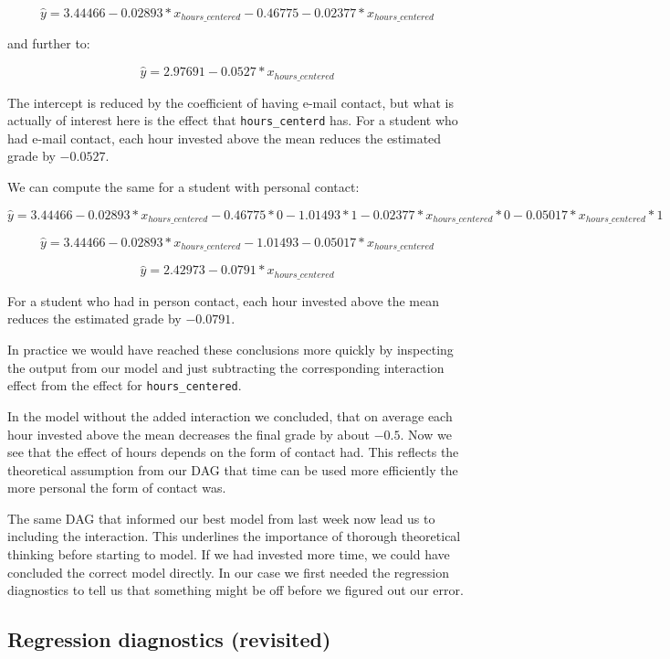 \documentclass[
]{book}
\begin{document}
\[\hat{y} = 3.44466 -0.02893 *x_{hours\_centered} -0.46775 -0.02377 * x_{hours\_centered}\]

and further to:

\[\hat{y} = 2.97691 -0.0527 *x_{hours\_centered}\]

The intercept is reduced by the coefficient of having e-mail contact, but what
is actually of interest here is the effect that \texttt{hours\_centerd} has. For a
student who had e-mail contact, each hour invested above the mean reduces the
estimated grade by \(-0.0527\).

We can compute the same for a student with personal contact:

\[\hat{y} = 3.44466 -0.02893 * x_{hours\_centered} -0.46775 * 0
-1.01493 * 1 
-0.02377 * x_{hours\_centered} * 0 
-0.05017 * x_{hours\_centered} * 1\]

\[\hat{y} = 3.44466 -0.02893 *x_{hours\_centered} -1.01493 -0.05017 * x_{hours\_centered}\]

\[\hat{y} = 2.42973 -0.0791 *x_{hours\_centered}\]

For a student who had in person contact, each hour invested above the mean
reduces the estimated grade by \(-0.0791\).

In practice we would have reached these conclusions more quickly by inspecting
the output from our model and just subtracting the corresponding interaction
effect from the effect for \texttt{hours\_centered}.

In the model without the added interaction we concluded, that on average each
hour invested above the mean decreases the final grade by about \(-0.5\). Now we
see that the effect of hours depends on the form of contact had. This reflects
the theoretical assumption from our DAG that time can be used more efficiently
the more personal the form of contact was.

The same DAG that informed our best model from last week now lead us to
including the interaction. This underlines the importance of thorough
theoretical thinking before starting to model. If we had invested more time, we
could have concluded the correct model directly. In our case we first needed the
regression diagnostics to tell us that something might be off before we figured
out our error.

\hypertarget{regression-diagnostics-revisited}{%
\subsection{Regression diagnostics (revisited)}\label{regression-diagnostics-revisited}}
\end{document}
